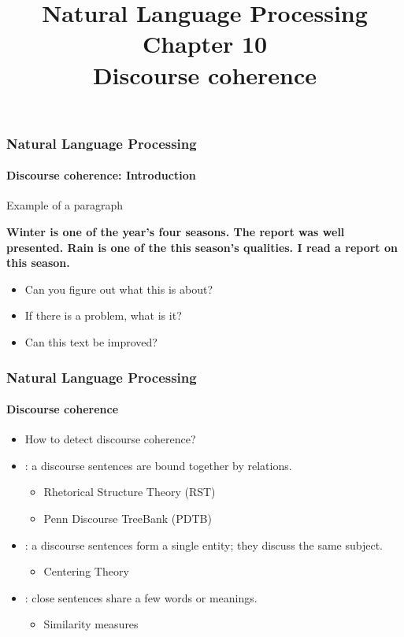 \documentclass[xcolor=table]{beamer}
\title[ESI - NLP: 10- Discourse coherence]%
{Natural Language Processing\\Chapter 10\\Discourse coherence}
\begin{document}
	
\begin{frame}
\frametitle{Natural Language Processing}
\framesubtitle{Discourse coherence: Introduction}

\begin{exampleblock}{Example of a paragraph}
	\begin{center}
		\Large\bfseries
		Winter is one of the year's four seasons.
		The report was well presented.
		Rain is one of the this season's qualities.
		I read a report on this season.
	\end{center}
\end{exampleblock}

\begin{itemize}
	\item Can you figure out what this is about?
	\item If there is a problem, what is it?
	\item Can this text be improved?
\end{itemize}

\end{frame}

\begin{frame}
	\frametitle{Natural Language Processing}
	\framesubtitle{Discourse coherence}
	
	\begin{itemize}
		\item How to detect discourse coherence?
		\item {}: a discourse sentences are bound together by relations. 
		\begin{itemize}
			\item Rhetorical Structure Theory (RST) 
			\item Penn Discourse TreeBank (PDTB)
		\end{itemize}
		\item {}: a discourse sentences form a single entity; they discuss the same subject.
		\begin{itemize}
			\item Centering Theory 
		\end{itemize}
		\item {}: close sentences share a few words or meanings.
		\begin{itemize}
			\item Similarity measures
		\end{itemize}
	\end{itemize}
	
\end{frame}
\end{document}
